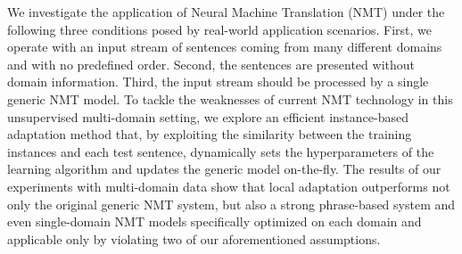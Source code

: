 We investigate the application of Neural Machine Translation (NMT) under the following three conditions posed by real-world application scenarios. First, we operate with an input stream of sentences coming from many different domains and with no predefined order. Second, the sentences are presented without domain information. Third, the input stream should be processed by a single generic NMT model. To tackle the weaknesses of current NMT technology in this unsupervised multi-domain setting, we explore an efficient instance-based adaptation method that, by exploiting the similarity between the training instances and each test sentence, dynamically sets the hyperparameters of the learning algorithm and updates the generic model on-the-fly. The results of our experiments with multi-domain data show that local adaptation outperforms not only the original generic NMT system, but also a strong phrase-based system and even single-domain NMT models  specifically optimized on each domain and applicable only by violating two of our aforementioned assumptions.
